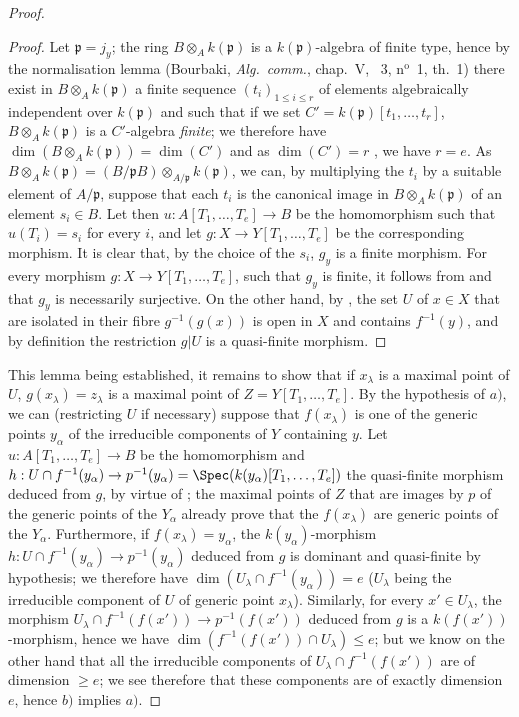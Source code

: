\begin{proof}
\begin{proof}
Let $\mathfrak{p}=j_y$; the ring $B\otimes_A k(\mathfrak{p})$ is a $k(\mathfrak{p})$-algebra of finite type, hence by the normalisation lemma (Bourbaki, \emph{Alg.\ comm.}, chap.~V, \textsection~3, n$^{\text{o}}$~1, th.~1) there exist in $B\otimes_A k(\mathfrak{p})$ a finite sequence $(t_i)_{1\leq i\leq r}$ of elements algebraically independent over $k(\mathfrak{p})$ and such that if we set $C'=k(\mathfrak{p})[t_1,\ldots,t_r]$, $B\otimes_A k(\mathfrak{p})$ is a $C'$-algebra \emph{finite}; we therefore have $\dim(B\otimes_A k(\mathfrak{p}))=\dim(C')$  and as $\dim(C')=r$ , we have $r=e$.
As $B\otimes_A k(\mathfrak{p})=(B/\mathfrak{p}B)\otimes_{A/\mathfrak{p}}k(\mathfrak{p})$, we can, by multiplying the $t_i$ by a suitable
element of $A/\mathfrak{p}$, suppose that each $t_i$ is the canonical image in $B\otimes_A k(\mathfrak{p})$ of an element $s_i\in B$.
Let then $u:A[T_1,\ldots,T_e]\to B$ be the homomorphism such that $u(T_i)=s_i$ for every $i$, and let $g:X\to Y[T_1,\ldots,T_e]$ be the corresponding morphism.
It is clear that, by the choice of the $s_i$, $g_y$ is a finite morphism.
For every morphism $g:X\to Y[T_1,\ldots,T_e]$, such that $g_y$ is finite, it follows from  and  that $g_y$ is necessarily surjective.
On the other hand, by , the set $U$ of $x\in X$ that are isolated in their fibre $g^{-1}(g(x))$ is open in $X$ and contains $f^{-1}(y)$, and by definition the restriction $g|U$ is a quasi-finite morphism.
\end{proof}

This lemma being established, it remains to show that if $x_\lambda$ is a maximal point of $U$, $g(x_\lambda)=z_\lambda$ is a maximal point of $Z=Y[T_1,\ldots,T_e]$.
By the hypothesis of $a)$, we can (restricting $U$ if necessary) suppose that $f(x_\lambda)$ is one of the generic points $y_\alpha$ of the irreducible components of $Y$ containing $y$.
Let $u:A[T_1,\ldots,T_e]\to B$ be the homomorphism and $h:U\cap f^{-1}(y_\alpha)\to p^{-1}(y_\alpha)=\Spec(k(y_\alpha)[T_1,\ldots,T_e])$ the quasi-finite morphism deduced from $g$, by virtue of ; the maximal points of $Z$ that are images by $p$ of the generic points of the $Y_\alpha$ already prove that the $f(x_\lambda)$ are generic points of the $Y_\alpha$.
Furthermore, if $f(x_\lambda)=y_\alpha$, the $k(y_\alpha)$-morphism $h:U\cap f^{-1}(y_\alpha)\to p^{-1}(y_\alpha)$ deduced from $g$ is dominant and quasi-finite by hypothesis; we therefore have $\dim(U_\lambda\cap f^{-1}(y_\alpha))=e$ ($U_\lambda$ being the irreducible component of $U$ of generic point $x_\lambda$).
Similarly, for every $x'\in U_\lambda$, the morphism $U_\lambda\cap f^{-1}(f(x'))\to p^{-1}(f(x'))$ deduced from $g$ is a $k(f(x'))$-morphism, hence  we have $\dim(f^{-1}(f(x'))\cap U_\lambda)\leq e$; but we know on the other hand  that all the irreducible components of $U_\lambda\cap f^{-1}(f(x'))$ are of dimension $\geq e$; we see therefore that these components are of exactly dimension $e$, hence $b)$ implies $a)$.


\end{proof}
